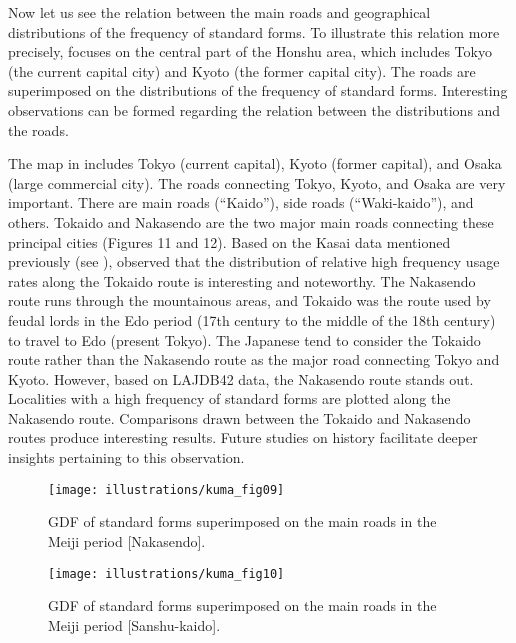 \documentclass[output=paper]{LSP/langsci}
\begin{document}
Now let us see the relation between the main roads and geographical distributions of the frequency of standard forms. To illustrate this relation more precisely,  focuses on the central part of the Honshu area, which includes Tokyo (the current capital city) and Kyoto (the former capital city). The roads are superimposed on the distributions of the frequency of standard forms. Interesting observations can be formed regarding the relation between the distributions and the roads.

\largerpage[2]
The map in  includes Tokyo (current capital), Kyoto (former capital), and Osaka (large commercial city). The roads connecting Tokyo, Kyoto, and Osaka are very important. There are main roads (“Kaido”), side roads (“Waki-kaido”), and others. Tokaido and Nakasendo are the two major main roads connecting these principal cities (Figures 11 and 12). Based on the Kasai data mentioned previously (see ), \citet[184]{tanaka_hyojungo:_1991} observed that the distribution of relative high frequency usage rates along the Tokaido route is interesting and noteworthy. The Nakasendo route runs through the mountainous areas, and Tokaido was the route used by feudal lords in the Edo period (17th century to the middle of the 18th century) to travel to Edo (present Tokyo). The Japanese tend to consider the Tokaido route rather than the Nakasendo route as the major road connecting Tokyo and Kyoto. However, based on LAJDB42 data, the Nakasendo route stands out. Localities with a high frequency of standard forms are plotted along the Nakasendo route. Comparisons drawn between the Tokaido and Nakasendo routes produce interesting results. Future studies on  history facilitate deeper insights pertaining to this observation.

\begin{figure}[p]
\texttt{[image: illustrations/kuma\_fig09]}
\caption{GDF of standard forms superimposed on the main roads in the Meiji period [Nakasendo].}          
\label{fig:kuma:9}
\end{figure}
\newpage	


\begin{figure}[p]
\texttt{[image: illustrations/kuma\_fig10]}
\caption{GDF of standard forms superimposed on the main roads in the Meiji period [Sanshu-kaido].}          
\label{fig:kuma:10}
\end{figure}
\clearpage
\end{document}
